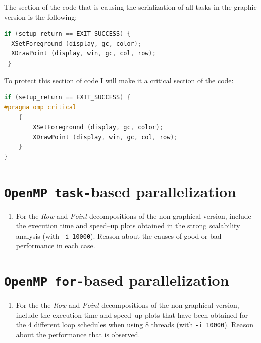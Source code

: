 \documentclass[a4paper]{article}
\begin{document}
The section of the code that is causing the serialization of all tasks in the graphic version is the following:

\begin{lstlisting}[language=C]
 if (setup_return == EXIT_SUCCESS) {
  XSetForeground (display, gc, color);
  XDrawPoint (display, win, gc, col, row);
 }           
\end{lstlisting}

To protect this section of code I will make it a critical section of the code:

\begin{lstlisting}[language=C]
if (setup_return == EXIT_SUCCESS) {
#pragma omp critical
	{
		XSetForeground (display, gc, color);
		XDrawPoint (display, win, gc, col, row);
	}
}           
\end{lstlisting}

\section{\texttt{OpenMP task-}based parallelization}

\begin{enumerate}
	\item For the \textit{Row} and \textit{Point} decompositions of the non-graphical version, include the execution time and speed–up plots obtained in the strong scalability analysis (with \texttt{-i 10000}). Reason about the causes of good or bad performance in each case.
\end{enumerate}

\section{\texttt{OpenMP for-}based parallelization}

\begin{enumerate}
	\item For the the \textit{Row} and \textit{Point} decompositions of the non-graphical version, include the execution time and speed–up plots that have been obtained for the 4 different loop schedules when using 8 threads (with \texttt{-i 10000}). Reason about the performance that is observed.
\end{enumerate}
\end{document}
